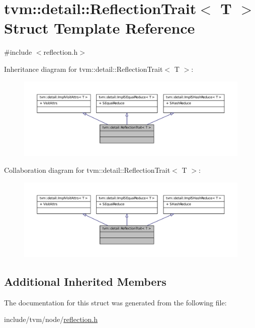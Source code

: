 \hypertarget{structtvm_1_1detail_1_1ReflectionTrait}{}\section{tvm\+:\+:detail\+:\+:Reflection\+Trait$<$ T $>$ Struct Template Reference}
\label{structtvm_1_1detail_1_1ReflectionTrait}


{\ttfamily \#include $<$reflection.\+h$>$}



Inheritance diagram for tvm\+:\+:detail\+:\+:Reflection\+Trait$<$ T $>$\+:
\nopagebreak
\begin{figure}[H]
\begin{center}
\leavevmode
\includegraphics[width=350pt]{structtvm_1_1detail_1_1ReflectionTrait__inherit__graph}
\end{center}
\end{figure}


Collaboration diagram for tvm\+:\+:detail\+:\+:Reflection\+Trait$<$ T $>$\+:
\nopagebreak
\begin{figure}[H]
\begin{center}
\leavevmode
\includegraphics[width=350pt]{structtvm_1_1detail_1_1ReflectionTrait__coll__graph}
\end{center}
\end{figure}
\subsection*{Additional Inherited Members}


The documentation for this struct was generated from the following file\+:\begin{DoxyCompactItemize}
\item 
include/tvm/node/\hyperlink{reflection_8h}{reflection.\+h}\end{DoxyCompactItemize}
